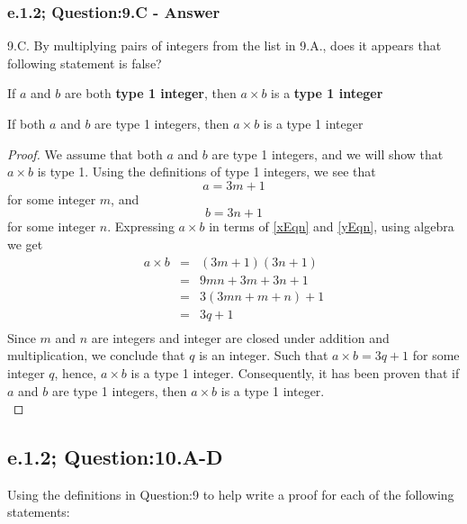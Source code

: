 \subsubsection*{e.1.2; Question:9.C - Answer}
9.C. By multiplying pairs of integers from the list in 9.A., does it appears that following statement is false? \\
\begin{center}
If $a$ and $b$ are both {\bf type 1 integer}, then $a \times b$ is a {\bf type 1 integer} \\
\end{center}

\begin{tcolorbox}
\begin{theorem}
If both $a$ and $b$ are type 1 integers, then $a \times b$ is a type 1 integer
\end{theorem}
\end{tcolorbox}

\begin{proof}
We assume that both $a$ and $b$ are type 1 integers, and we will show that $a \times b$ is type 1. Using the definitions of type 1 integers, we see that
\begin{equation}
\label{xEqn}
a = 3m + 1
\end{equation}
for some integer $m$, and
\begin{equation}
\label{yEqn}
b = 3n + 1
\end{equation}
for some integer $n$. Expressing $a \times b$ in terms of \ref{xEqn} and \ref{yEqn}, using algebra we get
\begin{eqnarray*}
a \times b & = & (3m + 1)(3n + 1)  \nonumber \\
& = & 9mn + 3m + 3n + 1 \nonumber \\
& = & 3(3mn + m + n) + 1 \nonumber \\
& = & 3q + 1 \nonumber \\
\end{eqnarray*}
Since $m$ and $n$ are integers and integer are closed under addition and multiplication, we conclude that $q$ is an integer. Such that $a \times b = 3q + 1$ for some integer $q$, hence, $a \times b$ is a type 1 integer. Consequently, it has been proven that if $a$ and $b$ are type 1 integers, then $a \times b$ is a type 1 integer. \\
\end{proof}




\subsection{e.1.2; Question:10.A-D}
Using the definitions in Question:9 to help write a proof for each of the following statements:

